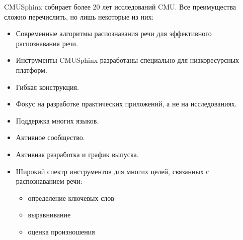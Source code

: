 CMUSphinx собирает более 20 лет исследований CMU. Все преимущества сложно перечислить,
но лишь некоторые из них:
\begin{itemize}
    \item Современные алгоритмы распознавания речи для эффективного распознавания речи.
    \item Инструменты CMUSphinx разработаны специально для низкоресурсных платформ.
    \item Гибкая конструкция.
    \item Фокус на разработке практических приложений, а не на исследованиях.
    \item Поддержка многих языков.
    \item Активное сообщество.
    \item Активная разработка и график выпуска.
    \item Широкий спектр инструментов для многих целей, связанных с распознаванием речи:
    \begin{itemize}
        \item определение ключевых слов
        \item выравнивание
        \item оценка произношения
    \end{itemize}
\end{itemize}
